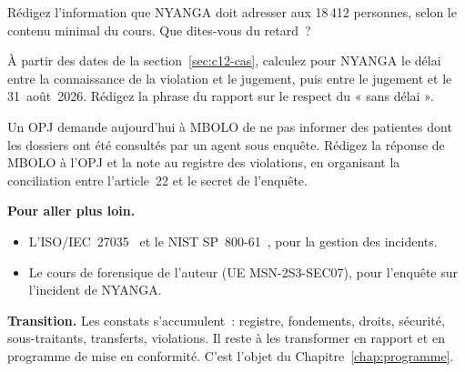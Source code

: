 \begin{boxexo}[title={\ding{45}\quad Exercice~15.2. Informer M. TAGNE \niveaumoyen}]
Rédigez l'information que NYANGA doit adresser aux 18\,412 personnes,
selon le contenu minimal du cours. Que dites-vous du retard~?
\end{boxexo}

\begin{boxexo}[title={\ding{45}\quad Exercice~15.3. La chronologie \niveaumoyen}]
À partir des dates de la section~\ref{sec:c12-cas}, calculez pour NYANGA le
délai entre la connaissance de la violation et le jugement, puis entre le
jugement et le 31~août~2026. Rédigez la phrase du rapport sur le respect du
« sans délai ».
\end{boxexo}

\begin{boxexo}[title={\ding{45}\quad Exercice~15.4. La demande de l'OPJ \niveauexpert}]
Un OPJ demande aujourd'hui à MBOLO de ne pas informer des patientes dont les
dossiers ont été consultés par un agent sous enquête. Rédigez la réponse de
MBOLO à l'OPJ et la note au registre des violations, en organisant la
conciliation entre l'article~22 et le secret de l'enquête.
\end{boxexo}

\bigskip

\begin{boxinfo}
\textbf{Pour aller plus loin.}
\begin{itemize}
    \item L'ISO/IEC~27035~\cite{iso27035} et le NIST SP~800-61~\cite{nist80061r2},
          pour la gestion des incidents.
    \item Le cours de forensique de l'auteur (UE MSN-2S3-SEC07), pour
          l'enquête sur l'incident de NYANGA.
\end{itemize}
\end{boxinfo}

\begin{boxinfo}
\textbf{Transition.} Les constats s'accumulent~: registre, fondements,
droits, sécurité, sous-traitants, transferts, violations. Il reste à les
transformer en rapport et en programme de mise en conformité. C'est
l'objet du Chapitre~\ref{chap:programme}.
\end{boxinfo}
